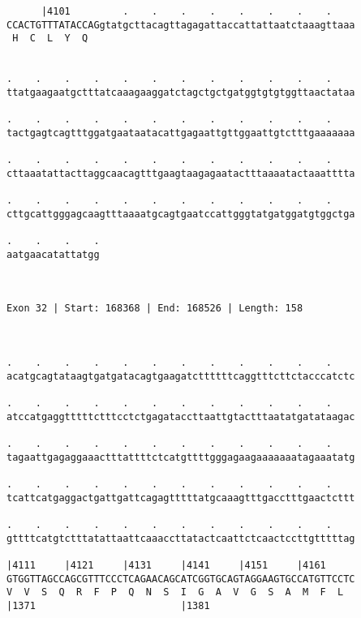\documentclass{article}
\begin{document}
\begin{Verbatim}
      |4101         .    .    .    .    .    .    .    .    
CCACTGTTTATACCAGgtatgcttacagttagagattaccattattaatctaaagttaaa
 H  C  L  Y  Q                                              
                                                            
  
.    .    .    .    .    .    .    .    .    .    .    .    
ttatgaagaatgctttatcaaagaaggatctagctgctgatggtgtgtggttaactataa
                                                            
.    .    .    .    .    .    .    .    .    .    .    .    
tactgagtcagtttggatgaataatacattgagaattgttggaattgtctttgaaaaaaa
                                                            
.    .    .    .    .    .    .    .    .    .    .    .    
cttaaatattacttaggcaacagtttgaagtaagagaatactttaaaatactaaatttta
                                                            
.    .    .    .    .    .    .    .    .    .    .    .    
cttgcattgggagcaagtttaaaatgcagtgaatccattgggtatgatggatgtggctga
                                                            
.    .    .    .
aatgaacatattatgg
                
                
 
Exon 32 | Start: 168368 | End: 168526 | Length: 158



.    .    .    .    .    .    .    .    .    .    .    .    
acatgcagtataagtgatgatacagtgaagatcttttttcaggtttcttctacccatctc
                                                            
.    .    .    .    .    .    .    .    .    .    .    .    
atccatgaggtttttctttcctctgagataccttaattgtactttaatatgatataagac
                                                            
.    .    .    .    .    .    .    .    .    .    .    .    
tagaattgagaggaaactttattttctcatgttttgggagaagaaaaaaatagaaatatg
                                                            
.    .    .    .    .    .    .    .    .    .    .    .    
tcattcatgaggactgattgattcagagtttttatgcaaagtttgacctttgaactcttt
                                                            
.    .    .    .    .    .    .    .    .    .    .    .    
gttttcatgtctttatattaattcaaaccttatactcaattctcaactccttgtttttag
                                                            
|4111     |4121     |4131     |4141     |4151     |4161     
GTGGTTAGCCAGCGTTTCCCTCAGAACAGCATCGGTGCAGTAGGAAGTGCCATGTTCCTC
V  V  S  Q  R  F  P  Q  N  S  I  G  A  V  G  S  A  M  F  L  
|1371                         |1381                         
  

\end{Verbatim}
\end{document}
